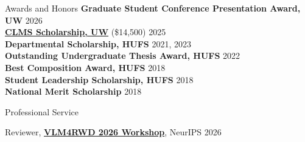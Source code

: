 \documentclass[
	11pt, %
]{resume} %
\begin{document}

\begin{rSection}{Awards and Honors}
    \textbf{Graduate Student Conference Presentation Award, UW} \hfill 2026 \\
    \textbf{\href{https://linguistics.washington.edu/honors-awards\#S06}{CLMS Scholarship, UW}} (\$14,500) \hfill 2025 \\
    \textbf{Departmental Scholarship, HUFS} \hfill 2021, 2023 \\
    \textbf{Outstanding Undergraduate Thesis Award, HUFS} \hfill 2022 \\
    \textbf{Best Composition Award, HUFS} \hfill 2018 \\
    \textbf{Student Leadership Scholarship, HUFS} \hfill 2018 \\
    \textbf{National Merit Scholarship} \hfill 2018
\end{rSection}


\begin{rSection}{Professional Service}
\begin{enumerate}[label={[\arabic*]}, leftmargin=*, itemsep=0.5em, topsep=0pt]
\item Reviewer, \textbf{\href{https://vlm4rwd.github.io/}{VLM4RWD 2026 Workshop}}, NeurIPS 2026
\end{enumerate}

\end{rSection}

\end{document}
